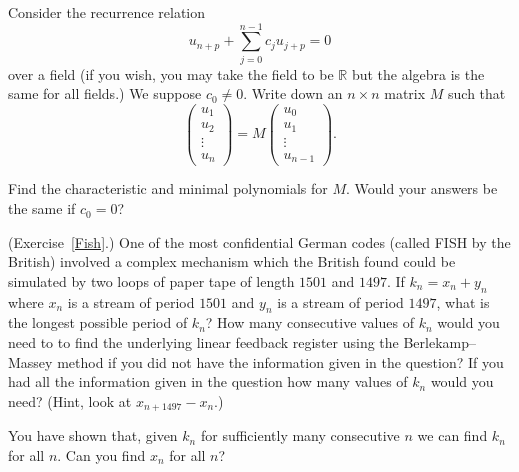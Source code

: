 \begin{question}\label{C4.5} 
Consider the recurrence relation
\[u_{n+p}+\sum_{j=0}^{n-1}c_{j}u_{j+p}=0\]
over a field (if you wish, you may take the field 
to be ${\mathbb R}$
but the algebra is the same for all fields.)
We suppose $c_{0}\neq 0$. 
Write down an $n\times n$
matrix $M$ such that 
\[\left(\begin{matrix}
u_{1}\\u_{2}\\ \vdots\\u_{n}
\end{matrix}\right)
=M\left(\begin{matrix}
u_{0}\\u_{1}\\ \vdots\\u_{n-1}
\end{matrix}\right).\]

Find the characteristic and minimal polynomials for $M$.
Would your answers be the same if $c_{0}=0$?
\end{question} 
\begin{question}\label{C4.6}
(Exercise~\ref{Fish}.)
One of the most confidential
German codes (called FISH by the British)
involved a complex mechanism which
the British found could be simulated
by two loops of paper tape of
length $1501$ and $1497$. If $k_{n}=x_{n}+y_{n}$
where $x_{n}$ is a stream of period $1501$
and $y_{n}$ is a stream of period $1497$,
what is the longest possible period of $k_{n}$?
How many consecutive values of $k_{n}$ would you
need to to find the underlying linear feedback register
using the Berlekamp--Massey method if you did
not have the information given in the question?
If you had
all the information given in the question
how many values of $k_{n}$ would you need?
(Hint, look at $x_{n+1497}-x_{n}$.)

You have shown that, given $k_{n}$ for sufficiently
many consecutive $n$ we can find $k_{n}$ for all $n$.
Can you find $x_{n}$ for all $n$? 
\end{question} 

